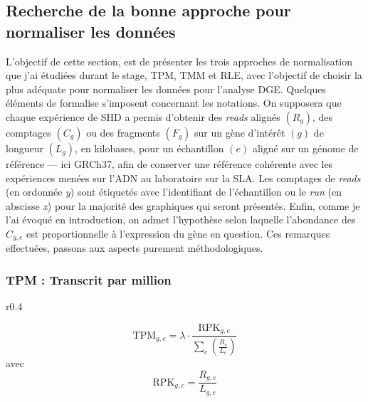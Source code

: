 \subsection{Recherche de la bonne approche pour normaliser les données }

L'objectif de cette section, est de présenter les trois approches de normalisation que j'ai étudiées durant le stage, TPM, TMM et RLE, avec l'objectif de choisir la plus adéquate pour normaliser les données pour l’analyse DGE.
Quelques éléments de formalise s'imposent concernant les notations. On supposera que chaque expérience de SHD a permis d’obtenir des \textit{reads} alignés \( (R_g) \), des comptages \( (C_g) \) ou des fragments \( (F_g) \) sur un gène d’intérêt \( (g) \) de longueur \( (L_g) \), en kilobases, pour un échantillon \( (e) \) aligné sur un génome de référence --- ici GRCh37, afin de conserver une référence cohérente avec les expériences menées sur l'ADN au laboratoire sur la SLA. Les comptages de \textit{reads} (en ordonnée \textit{y}) sont étiquetés avec l’identifiant de l’échantillon ou le \textit{run} (en abscisse \textit{x}) pour la majorité des graphiques qui seront présentés. Enfin, comme je l'ai évoqué en introduction, on admet l’hypothèse selon laquelle l’abondance des \( C_{g,e} \) est proportionnelle à l’expression du gène en question. Ces remarques effectuées, passons aux aspects purement méthodologiques.

\newpage 
\subsubsection{TPM : Transcrit par million}

\begin{wrapfigure}{r}{0.4\textwidth}
\vspace{-10mm}
\begin{tcolorbox}[colback=lightgray,colframe=darkblue,boxrule=0.5pt,arc=2pt,boxsep=5pt,width=0.40\textwidth,title=\center Formule de calcul des TPM,fonttitle=\bfseries\small]
\begin{equation*}
\mathrm{TPM}_{g,e} = \lambda \cdot \frac{\mathrm{RPK}_{g,e}}{\sum_e \left( \frac{R_e}{L_e} \right)}
\end{equation*}
\smallskip
avec\quad
\begin{equation*}
\mathrm{RPK}_{g,e} = \frac{R_{g,e}}{L_{g,e}}
\end{equation*}
\end{tcolorbox}
\vspace{-5mm}
\end{wrapfigure}

